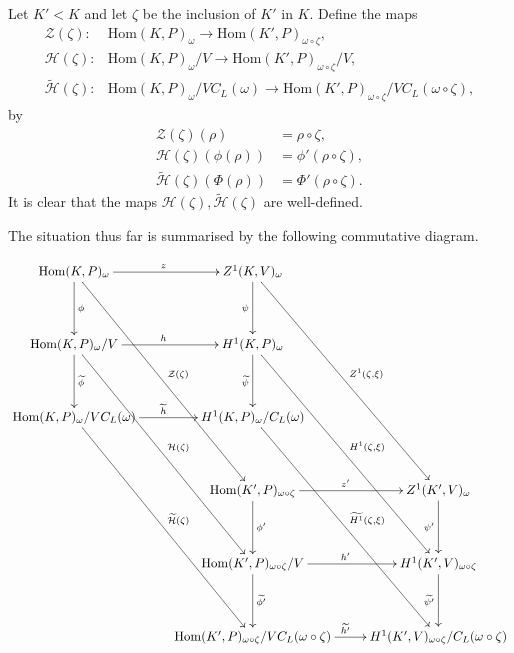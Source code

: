 \begin{definition} \label{main_cd} Let $K' < K$ and let $\zeta$ be the inclusion of $K'$ in $K$. Define the maps
	\begin{align*}
		\mathcal{Z}(\zeta):&\mathrm{Hom}(K, P)_\omega \rightarrow \mathrm{Hom}(K', P)_{\omega\circ\zeta}, \\
		\mathcal{H}(\zeta):&\mathrm{Hom}(K, P)_\omega/V \rightarrow \mathrm{Hom}(K', P)_{\omega\circ\zeta}/V, \\
		\widetilde{\mathcal{H}}(\zeta):&\mathrm{Hom}(K, P)_\omega/VC_L(\omega) \rightarrow \mathrm{Hom}(K', P)_{\omega\circ\zeta}/VC_L(\omega\circ\zeta),
	\end{align*}
	by
	\begin{align*}
		\mathcal{Z}(\zeta)(\rho) &= \rho\circ\zeta, \\
		\mathcal{H}(\zeta)(\phi(\rho)) &= \phi'(\rho\circ\zeta), \\
		\widetilde{\mathcal{H}}(\zeta)(\Phi(\rho)) &= \Phi'(\rho\circ\zeta).
	\end{align*}
It is clear that the maps $\mathcal{H}(\zeta), \widetilde{\mathcal{H}}(\zeta)$ are well-defined.

The situation thus far is summarised by the following commutative diagram.
\par\nobreak
	{\small
	\setlength{\abovedisplayskip}{6pt}
	\setlength{\belowdisplayskip}{\abovedisplayskip}
	\setlength{\abovedisplayshortskip}{3pt}
	\setlength{\belowdisplayshortskip}{3pt}
	\begin{align*}
		\xymatrix@R=40pt{
			\mathrm{Hom}(K, P)_\omega \ar[r]^{z} \ar[d]^{\phi} \ar[dddr]^{\mathcal{Z}(\zeta)} & Z^1(K, V)_\omega \ar[d]_{\psi} \ar[dddr]^{Z^1(\zeta, \xi)} & \\
			\mathrm{Hom}(K, P)_\omega/V \ar[r]^{h} \ar[d]^{\widetilde{\phi}} \ar[dddr]^{\mathcal{H}(\zeta)} & H^1(K, P)_\omega \ar[d]_{\widetilde{\psi}} \ar[dddr]^{H^1(\zeta, \xi)} & \\
			\mathrm{Hom}(K, P)_\omega/VC_L(\omega) \ar[r]^{\widetilde{h}} \ar[dddr]^{\widetilde{\mathcal{H}}(\zeta)} & H^1(K, P)_\omega/C_L(\omega) \ar[dddr]^{\widetilde{H^1}(\zeta, \xi)} & \\
			& \mathrm{Hom}(K', P)_{\omega\circ\zeta} \ar[r]^{z'} \ar[d]^{\phi'} & Z^1(K', V)_\omega \ar[d]_{\psi'} \\
			& \mathrm{Hom}(K', P)_{\omega\circ\zeta}/V \ar[r]^{h'} \ar[d]^{\widetilde{\phi'}} & H^1(K', V)_{\omega\circ\zeta} \ar[d]_{\widetilde{\psi'}} \\
			& \mathrm{Hom}(K', P)_{\omega\circ\zeta}/VC_L(\omega\circ\zeta) \ar[r]^{\widetilde{h'}} & H^1(K', V)_{\omega\circ\zeta}/C_L(\omega\circ\zeta) \\
		}
	\end{align*}
	}%
\end{definition}

